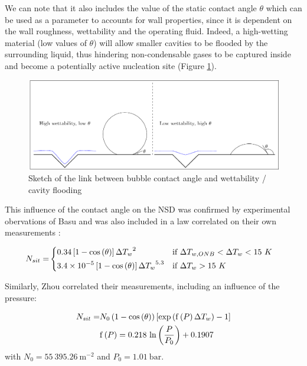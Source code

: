 We can note that it also includes the value of the static contact angle $\theta$ which can be used as a parameter to accounts for wall properties, since it is dependent on the wall roughness, wettability and the operating fluid.  Indeed, a high-wetting material (low values of $\theta$) will allow smaller cavities to be flooded by the surrounding liquid, thus hindering non-condensable gases to be captured inside and become a potentially active nucleation site (Figure \ref{fig:nsd_theta_wet}).

\begin{figure}[h!]
\centering
\includegraphics[scale=0.8]{img/NSD/wettability.pdf}
\caption{Sketch of the link between bubble contact angle and wettability / cavity flooding}
\label{fig:nsd_theta_wet}
\end{figure}

This influence of the contact angle on the NSD was confirmed by experimental obervations of Basu \etal \cite{basu_wall_2005} and was also included in a law correlated on their own measurements :

\begin{align}
N_{sit}=&
\begin{dcases}
0.34\left[ 1-\mathrm{cos}\left( \theta \right) \right] {\Delta T_{w}}^{2} & \text{if } \Delta T_{w,ONB}<\Delta T_{w} < 15\ K\\
3.4\times 10^{-5}\left[ 1-\mathrm{cos}\left( \theta \right) \right] {\Delta T_{w}}^{5.3} & \text{if } \Delta T_{w} > 15\ K
\end{dcases}
\label{eq:nsit_basu}
\end{align}

\npar

Similarly, Zhou \etal \cite{zhou_experimental_2020} correlated their measurements, including an influence of the pressure:

\begin{align}
N_{sit} =& N_{0}\left( 1-\mathrm{cos}\left( \theta \right) \right)\left[ \mathrm{exp}\left( \mathrm{f}\left( P \right) \Delta T_{w}  \right) -1  \right]
\label{eq:nsit_zhou}\\
&\mathrm{f}\left( P \right) = 0.218~\mathrm{ln}\left( \dfrac{P}{P_{0}} \right)+0.1907
\end{align}
with $N_{0}=55~395.26\ \mathrm{m}^{-2}$ and $P_{0}=1.01\ \mathrm{bar}$.

